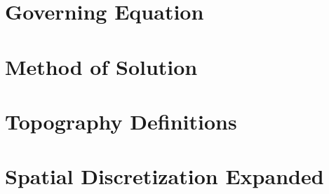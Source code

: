 \documentclass[letterpaper]{article}
\begin{document}
\section{Governing Equation} \label{sec:gov_eq}

 
\section{Method of Solution} \label{sec:method_of_sol}

 
 
\newpage
\begin{appendices}
    \section{Topography Definitions} \label{sec:topography}

    \section{Spatial Discretization Expanded}\label{sec:space_discrete_expand}
    
\end{appendices}

\newpage
\printbibliography
\end{document}

